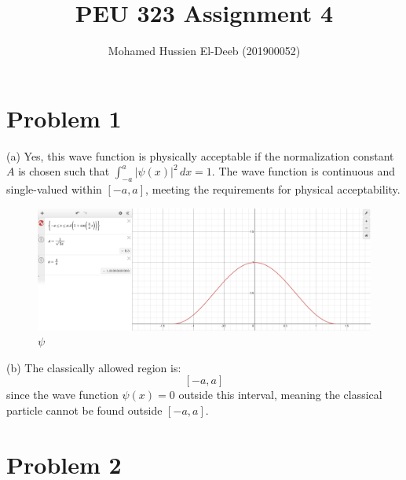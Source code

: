 \documentclass[12pt]{article}
\title{PEU 323 Assignment 4}
\author{Mohamed Hussien El-Deeb (201900052)}
\date{}
\begin{document}
\renewcommand{\labelenumi}{\textbf{(\alph{enumi})}}

\maketitle
\tableofcontents
\newpage
\section{Problem 1}

 (a) Yes, this wave function is physically acceptable if the normalization constant \( A \) is chosen such that \(\int_{-a}^{a} |\psi(x)|^2 \, dx = 1\). The wave function is continuous and single-valued within \([-a, a]\), meeting the requirements for physical acceptability.

\begin{figure}[H]
    \centering
    \includegraphics[width=0.7\linewidth]{Q1.png}
    \caption{$\psi$}
\end{figure}

(b) The classically allowed region is:
\[
    [-a, a]
\]
since the wave function \(\psi(x) = 0\) outside this interval, meaning the classical particle cannot be found outside \([-a, a]\).
\newpage
\section{Problem 2}
\end{document}
